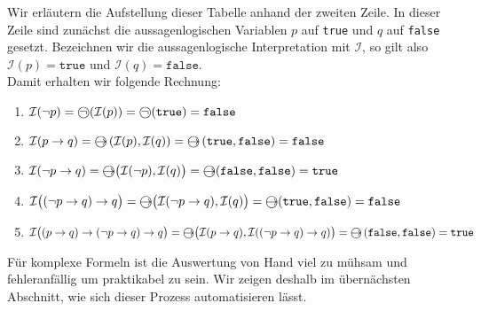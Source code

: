Wir erl\"{a}utern die Aufstellung dieser Tabelle anhand der zweiten Zeile.  In dieser Zeile sind zun\"{a}chst die
aussagenlogischen Variablen $p$ auf \texttt{true} und $q$ auf \texttt{false} gesetzt.  Bezeichnen wir die
aussagenlogische Interpretation mit $\mathcal{I}$, so gilt also\\[0.2cm]
\hspace*{1.3cm} $\mathcal{I}(p) = \mathtt{true}$ und $\mathcal{I}(q) = \mathtt{false}$. \\[0.2cm]
Damit erhalten wir folgende Rechnung:
\begin{enumerate}
\item $\mathcal{I}(\neg p) = \circneg\,(\mathcal{I}(p)) = \circneg\,( \mathtt{true}) = \mathtt{false}$
\item $\mathcal{I}(p \rightarrow q) = \circright\,(\mathcal{I}(p), \mathcal{I}(q)) = \circright\,(\mathtt{true}, \mathtt{false}) = \mathtt{false}$
\item $\mathcal{I}(\neg p \rightarrow q) = \circright\bigl( \mathcal{I}(\neg p), \mathcal{I}(q)\bigr) = \circright(\mathtt{false}, \mathtt{false}) = \mathtt{true}$
\item $\mathcal{I}\bigl((\neg p \rightarrow q) \rightarrow q\bigr) = 
          \circright\bigl( \mathcal{I}(\neg p \rightarrow q), \mathcal{I}(q) \bigr) = 
          \circright( \mathtt{true}, \mathtt{false} ) = \mathtt{false}$
\item $\mathcal{I}\bigl((p \rightarrow q) \rightarrow  (\neg p \rightarrow q) \rightarrow q\bigr) = 
      \circright\bigl( \mathcal{I}(p \rightarrow q),  \mathcal{I}((\neg p \rightarrow q) \rightarrow q)\bigr) = 
       \circright\,( \mathtt{false},  \mathtt{false} ) = \mathtt{true}$
\end{enumerate}
F\"{u}r komplexe Formeln ist die Auswertung von Hand viel zu m\"{u}hsam und
fehleranf\"{a}llig um praktikabel zu sein.  Wir zeigen deshalb im \"{u}bern\"{a}chsten Abschnitt, wie
sich dieser Prozess automatisieren l\"{a}sst.


